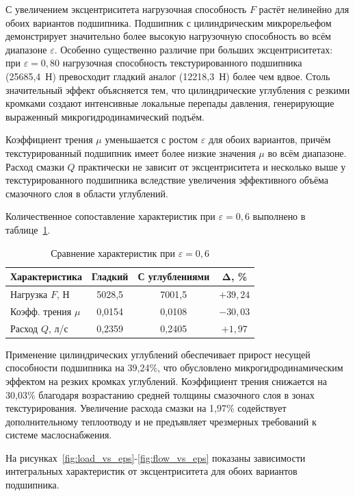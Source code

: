 С увеличением эксцентриситета нагрузочная способность $F$ растёт нелинейно для обоих вариантов подшипника. Подшипник с цилиндрическим микрорельефом демонстрирует значительно более высокую нагрузочную способность во всём диапазоне $\varepsilon$. Особенно существенно различие при больших эксцентриситетах: при $\varepsilon = 0{,}80$ нагрузочная способность текстурированного подшипника (25685{,}4~Н) превосходит гладкий аналог (12218{,}3~Н) более чем вдвое. Столь значительный эффект объясняется тем, что цилиндрические углубления с резкими кромками создают интенсивные локальные перепады давления, генерирующие выраженный микрогидродинамический подъём.

Коэффициент трения $\mu$ уменьшается с ростом $\varepsilon$ для обоих вариантов, причём текстурированный подшипник имеет более низкие значения $\mu$ во всём диапазоне. Расход смазки $Q$ практически не зависит от эксцентриситета и несколько выше у текстурированного подшипника вследствие увеличения эффективного объёма смазочного слоя в области углублений.

Количественное сопоставление характеристик при $\varepsilon = 0{,}6$ выполнено в таблице~\ref{tab:comparison}.

\begin{table}[H]
\small
\centering
\caption{Сравнение характеристик при $\varepsilon = 0{,}6$}
\label{tab:comparison}
\begin{tabular}{|l|c|c|c|}
\hline
\textbf{Характеристика} & \textbf{Гладкий} & \textbf{С углублениями} & $\boldsymbol{\Delta}$\textbf{, \%} \\
\hline
Нагрузка $F$, Н & 5028{,}5 & 7001{,}5 & $+39{,}24$ \\
\hline
Коэфф. трения $\mu$ & 0{,}0154 & 0{,}0108 & $-30{,}03$ \\
\hline
Расход $Q$, л/с & 0{,}2359 & 0{,}2405 & $+1{,}97$ \\
\hline
\end{tabular}
\end{table}

Применение цилиндрических углублений обеспечивает прирост несущей способности подшипника на 39{,}24\%, что обусловлено микрогидродинамическим эффектом на резких кромках углублений. Коэффициент трения снижается на 30{,}03\% благодаря возрастанию средней толщины смазочного слоя в зонах текстурирования. Увеличение расхода смазки на 1{,}97\% содействует дополнительному теплоотводу и не предъявляет чрезмерных требований к системе маслоснабжения.

На рисунках~\ref{fig:load_vs_eps}-\ref{fig:flow_vs_eps} показаны зависимости интегральных характеристик от эксцентриситета для обоих вариантов подшипника.

